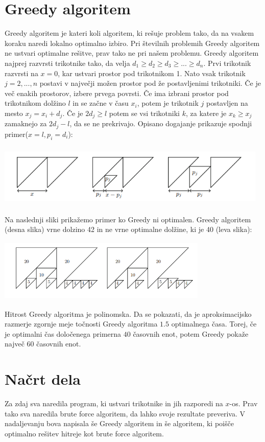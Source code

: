 \documentclass[a4paper,12pt]{article}
\theoremstyle{definition}
\theoremstyle{plain}
\begin{document}
\newpage
\section{Greedy algoritem}
Greedy algoritem je kateri koli algoritem, ki rešuje problem tako, da na vsakem koraku naredi lokalno optimalno izbiro. Pri številnih problemih Greedy algoritem ne ustvari optimalne rešitve, prav tako ne pri našem problemu. 
Greedy algoritem najprej razvrsti trikotnike tako, da velja \newline
$d_1 \geq d_2 \geq d_3 \geq ... \geq d_n$. Prvi trikotnik razvrsti na $x=0$, kar ustvari prostor pod trikotnikom 1.
Nato vsak trikotnik $j=2,...,n$ postavi v največji možen prostor pod že postavljenimi trikotniki. Če je več enakih prostorov, izbere prvega povrsti.
Če ima izbrani prostor pod trikotnikom dolžino $l$ in se začne v času $x_i$, potem je trikotnik $j$ postavljen na mesto $x_j=x_i+d_j$. Če je $2d_j \ge l$  potem se vsi trikotniki $k$, za katere je $x_k \ge x_j$ zamaknejo za $ 2d_j-l$, da se ne prekrivajo. Opisano 
dogajanje prikazuje spodnji primer($x=l, p_i = d_i $):
\begin{center}
    \includegraphics[width=13cm, height=3cm]{greedy.png} 
 \end{center}
Na naslednji sliki prikažemo primer ko Greedy ni optimalen. Greedy algoritem (desna slika) vrne dolzino 42 in ne vrne optimalne dolžine, ki je 40 (leva slika):
\begin{center}
    \includegraphics[width=10cm, height=3cm]{primer_neoptimalnosti_greedy.png} 
 \end{center}
Hitrost Greedy algoritma je polinomska. Da se pokazati, da je aproksimacijsko razmerje zgornje meje točnosti Greedy algoritma $1.5$ optimalnega časa. Torej, če je optimalni čas določenega primerna
$40$ časovnih enot, potem Greedy pokaže največ $60$ časovnih enot.

\section{Načrt dela}
Za zdaj sva naredila program, ki ustvari trikotnike in jih razporedi na \newline $x$-os. Prav tako sva naredila brute force algoritem, da lahko svoje rezultate preveriva.
V nadaljevanju bova napisala še Greedy algoritem in še algoritem, ki poišče optimalno rešitev hitreje kot brute force algoritem.
  
 
\end{document}
